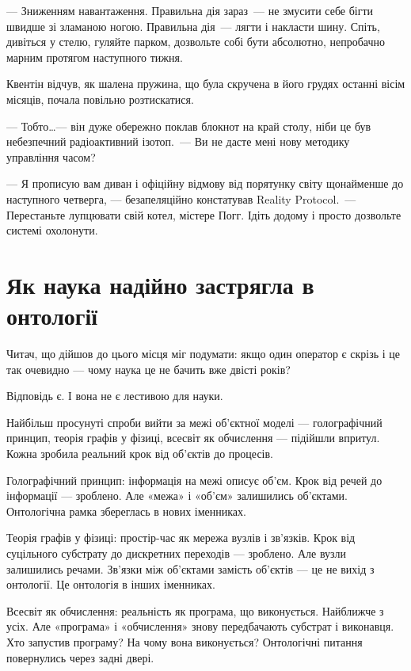 \documentclass[12pt, a4paper, openany]{book}
\begin{document}
\begin{realitybox}
--- Зниженням навантаження. Правильна дія зараз~--- не змусити себе бігти швидше зі зламаною ногою. Правильна дія~--- лягти і накласти шину. Спіть, дивіться у стелю, гуляйте парком, дозвольте собі бути абсолютно, непробачно марним протягом наступного тижня.

\medskip
Квентін відчув, як шалена пружина, що була скручена в його грудях останні вісім місяців, почала повільно розтискатися.

--- Тобто\ldots --- він дуже обережно поклав блокнот на край столу, ніби це був небезпечний радіоактивний ізотоп.~--- Ви не дасте мені нову методику управління часом?

--- Я прописую вам диван і офіційну відмову від порятунку світу щонайменше до наступного четверга, --- безапеляційно констатував Reality Protocol.~--- Перестаньте лупцювати свій котел, містере Погг. Ідіть додому і просто дозвольте системі охолонути.
\end{realitybox}

\chapter{Як наука надійно застрягла в онтології}

Читач, що дійшов до цього місця міг подумати: якщо один оператор є скрізь і це так очевидно --- чому наука це не бачить вже двісті років?

Відповідь є. І вона не є лестивою для науки.

Найбільш просунуті спроби вийти за межі об'єктної моделі --- голографічний принцип, теорія графів у фізиці, всесвіт як обчислення --- підійшли впритул. Кожна зробила реальний крок від об'єктів до процесів.

Голографічний принцип: інформація на межі описує об'єм. Крок від речей до інформації --- зроблено. Але «межа» і «об'єм» залишились об'єктами. Онтологічна рамка збереглась в нових іменниках.

Теорія графів у фізиці: простір-час як мережа вузлів і зв'язків. Крок від суцільного субстрату до дискретних переходів --- зроблено. Але вузли залишились речами. Зв'язки між об'єктами замість об'єктів --- це не вихід з онтології. Це онтологія в інших іменниках.

Всесвіт як обчислення: реальність як програма, що виконується. Найближче з усіх. Але «програма» і «обчислення» знову передбачають субстрат і виконавця. Хто запустив програму? На чому вона виконується? Онтологічні питання повернулись через задні двері.
\end{document}
